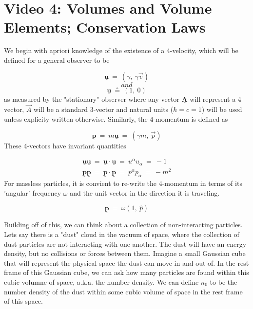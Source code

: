 \section*{Video 4: Volumes and Volume Elements; Conservation Laws}
\hskip 25pt We begin with apriori knowledge of the existence of a 4-velocity, which will be defined for a general observer
to be

\begin{equation}
  \underline{\mathbf{u}}\ =\ \left (\gamma,\ \gamma\vec{v}\right )
\end{equation}
$$\mathit{and}$$
\begin{equation}
  \underline{\mathbf{u}}\ \circeq\ \left (1,\ 0\right )
\end{equation}
as measured by the "stationary" observer where any vector $\underline{\mathbf{A}}$ will represent a 4-vector, $\vec{A}$ will be a standard 3-vector and natural units ($\hbar=c=1$) will be used unless explicity written otherwise.  Similarly, the 4-momentum is defined as

\begin{equation}
  \underline{\mathbf{p}}\ =\ m\underline{\mathbf{u}}\ =\ \left (\gamma m,\ \vec{p}\right )
\end{equation}
These 4-vectors have invariant quantities

\begin{equation}
  \begin{gathered}
    \underline{\mathbf{u}}\underline{\mathbf{u}}\ =\ \underline{\mathbf{u}}\cdot\underline{\mathbf{u}}\
    =\ u^{\alpha}u_{\alpha}\ =\ -1 \\
    \underline{\mathbf{p}}\underline{\mathbf{p}}\ =\ \underline{\mathbf{p}}\cdot\underline{\mathbf{p}}\
    =\ p^{\alpha}p_{\alpha}\ =\ -m^2
  \end{gathered}
\end{equation}
For massless particles, it is convient to re-write the 4-momentum in terms of its 'angular' frequency $\omega$ and the unit vector in the direction it is traveling.

\begin{equation}
  \underline{\mathbf{p}}\ =\ \omega\left (1,\ \hat{p}\right )
\end{equation}

\hskip 25pt Building off of this, we can think about a collection of non-interacting particles.  Lets say there is a "dust" cloud in the vacuum of space, where the collection of dust particles are not interacting with one another.  The dust will have an energy density, but no collisions or forces between them.  Imagine a small Gaussian cube that will represent the physical space the dust can move in and out of.  In the rest frame of this Gaussian cube, we can ask how many particles are found within this cubic volumne of space, a.k.a. the number density.  We can define $n_0$ to be the number density of the dust within some cubic volume of space in the rest frame of this space.

